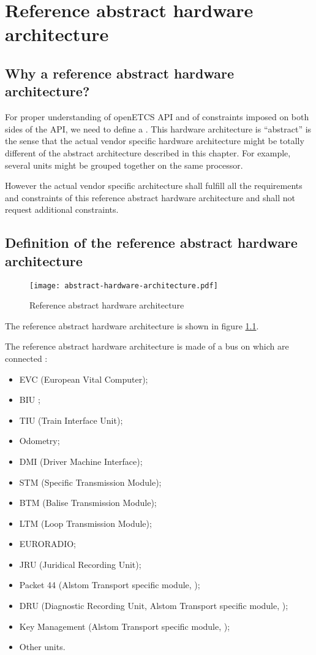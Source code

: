 \chapter{Reference abstract hardware architecture}

\section{Why a reference abstract hardware architecture?}

For proper understanding of openETCS API and of constraints imposed on
both sides of the API, we need to define a . This hardware architecture is ``abstract''
is the sense that the actual vendor specific hardware architecture
might be totally different of the abstract architecture described in
this chapter. For example, several units might be grouped together on
the same processor.

However the actual vendor specific architecture shall fulfill all the
requirements and constraints of this reference abstract hardware
architecture and shall not request additional constraints.

\section{Definition of the reference abstract hardware architecture}

\begin{figure}
  \centering
  \texttt{[image: abstract-hardware-architecture.pdf]}
  \caption{Reference abstract hardware architecture}
  \label{fig:hardware-arch}
\end{figure}

The reference abstract hardware architecture is shown in figure
\ref{fig:hardware-arch}.

The reference abstract hardware architecture is made of a bus on which
are connected :
\begin{itemize}
\item EVC (European Vital Computer);
\item BIU ;
\item TIU (Train Interface Unit);
\item Odometry;
\item DMI (Driver Machine Interface);
\item STM (Specific Transmission Module);
\item BTM (Balise Transmission Module);
\item LTM (Loop Transmission Module);
\item EURORADIO;
\item JRU (Juridical Recording Unit);
\item Packet 44 (Alstom Transport specific module, \cite{alstom-api});
\item DRU (Diagnostic Recording Unit, Alstom Transport specific
  module, \cite{alstom-api});
\item Key Management (Alstom Transport specific module,
  \cite{alstom-api});
\item Other units.
\end{itemize}

